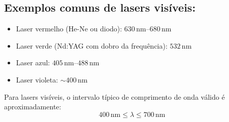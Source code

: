 \documentclass[a4paper,12pt]{article}
\begin{document}
\vspace{0.5cm}

\subsection*{Exemplos comuns de lasers visíveis:}
\begin{itemize}
    \item Laser vermelho (He-Ne ou diodo): \(630\,\mathrm{nm} – 680\,\mathrm{nm}\)
    \item Laser verde (Nd:YAG com dobro da frequência): \(532\,\mathrm{nm}\)
    \item Laser azul: \(405\,\mathrm{nm} – 488\,\mathrm{nm}\)
    \item Laser violeta: \( \sim 400\,\mathrm{nm} \)
\end{itemize}

\vspace{0.5cm}

Para lasers visíveis, o intervalo típico de comprimento de onda válido é aproximadamente:
\[
\boxed{400\,\mathrm{nm} \leq \lambda \leq 700\,\mathrm{nm}}
\]
\end{document}
